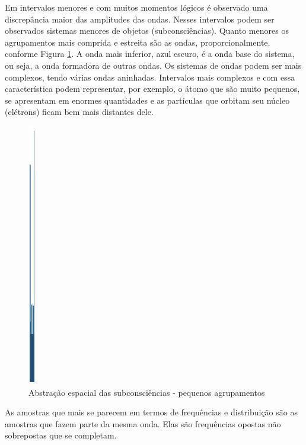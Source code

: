 Em intervalos menores e com muitos momentos lógicos é observado uma discrepância maior das amplitudes das ondas. Nesses intervalos podem ser observados sistemas menores de objetos (subconsciências). Quanto menores os agrupamentos mais comprida e estreita são as ondas, proporcionalmente, conforme Figura \ref{fig:consciousness_space_subconsciousness_min}. A onda mais inferior, azul escuro, é a onda base do sistema, ou seja, a onda formadora de outras ondas. Os sistemas de ondas podem ser mais complexos, tendo várias ondas aninhadas. Intervalos mais complexos e com essa característica podem representar, por exemplo, o átomo que são muito pequenos, se apresentam em enormes quantidades e as partículas que orbitam seu núcleo (elétrons) ficam bem mais distantes dele.
	\begin{figure}[H]
	\caption{Abstração espacial das subconsciências - pequenos agrupamentos}
	\label{fig:consciousness_space_subconsciousness_min}
	\centering
	\includegraphics[scale=.6]{sections/images/consciousness_space_subconsciousness_min.jpg}
	\end{figure}

As amostras que mais se parecem em termos de frequências e distribuição são as amostras que fazem parte da mesma onda. Elas são frequências opostas não sobrepostas que se completam.

